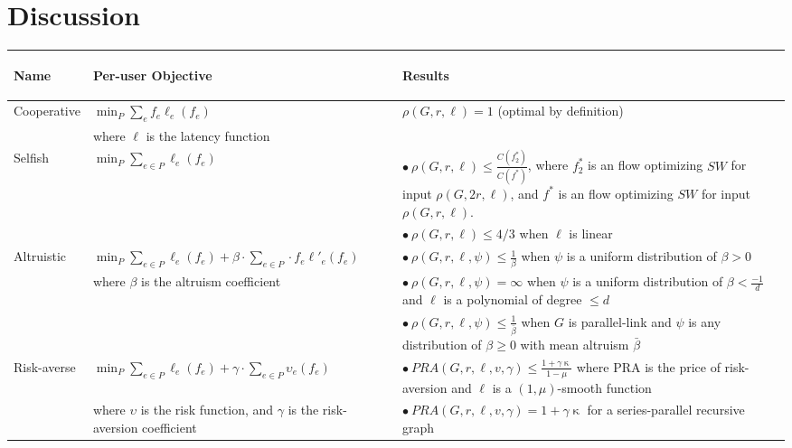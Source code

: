 \section{Discussion}\label{sec:discussion}

\begin{table}[h]
\begin{center}
    \begin{tabular}{|p{2cm}| p{6cm} | p{7cm}|} 
 \hline
        \begin{center}Name\end{center} & \begin{center}Per-user Objective\end{center} & \begin{center} Results\end{center} \\
 \hline\hline
        Cooperative & $\min_P \sum_e f_e\ell_e(f_e)$ & $\rho(G,r,\ell) = 1$ (optimal by definition) \\
            &where $\ell$ is the latency function & \\
 \hline
     Selfish & $\min_P \sum_{e\in P}\ell_e(f_e)$ & 
        $\bullet~\rho(G,r,\ell) \le \frac{C(f^*_2)}{C(f^*)}$, where $f^*_2$ is an flow optimizing $SW$ for input $\rho(G,2r,\ell)$, and $f^*$ is an flow optimizing $SW$ for input $\rho(G,r,\ell)$.\\ 
        &  & $\bullet~\rho(G,r,\ell) \le 4/3$ when $\ell$ is linear\\
 \hline
        Altruistic & $\min_P \sum_{e\in P} \ell_e(f_e) + \beta\cdot\sum_{e\in P} \cdot f_e\ell'_e(f_e)$  & 
        $\bullet~\rho(G,r,\ell,\psi) \le \frac{1}{\beta}$ when $\psi$ is a uniform distribution of $\beta >0$\\
        & where $\beta$ is the altruism coefficient & $\bullet~\rho(G,r,\ell,\psi) = \infty$ when $\psi$ is a uniform distribution of $\beta < \frac{-1}{d}$ and $\ell$ is a polynomial of degree $\le d$\\
        & & $\bullet~\rho(G,r,\ell,\psi) \le \frac{1}{\bar{\beta}}$ when $G$ is parallel-link and $\psi$ is any distribution of $\beta \ge 0$ with mean altruism $\bar{\beta}$\\
\hline
    Risk-averse & $\min_P \sum_{e\in P} \ell_e(f_e) + \gamma\cdot \sum_{e\in P}\upsilon_e(f_e) $ & 
    $\bullet~PRA(G,r,\ell,v,\gamma) \leq \frac{1 + \gamma\upkappa}{1 - \mu}$ where PRA is the price of risk-aversion and $\ell$ is a $(1,\mu)$-smooth function\\
    & where $\upsilon$ is the risk function, and $\gamma$ is the risk-aversion coefficient  & $\bullet~PRA(G,r,\ell,v,\gamma) = 1 + \gamma\upkappa $ for a series-parallel recursive graph\\

\end{tabular}
\end{center}
\end{table}
